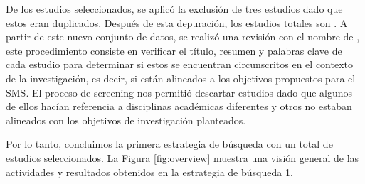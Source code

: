 
De los \itot{} estudios seleccionados, se aplicó la exclusión de tres estudios dado que estos eran duplicados. Después de esta depuración, los estudios totales son \depTot{}. A partir de este nuevo conjunto de datos, se realizó una revisión con el nombre de  , este procedimiento consiste en verificar el título, resumen y palabras clave de cada estudio para determinar si estos se encuentran circunscritos en el contexto de la investigación, es decir, si están alineados a los objetivos propuestos para el SMS. El proceso de screening nos permitió descartar \screen{} estudios dado que algunos de ellos hacían referencia a disciplinas académicas diferentes y otros no estaban alineados con los objetivos de investigación planteados.

Por lo tanto, concluimos la primera estrategia de búsqueda con un total de \screenTot{} estudios seleccionados. La Figura \ref{fig:overview} muestra una visión general de las actividades y resultados obtenidos en la estrategia de búsqueda 1.

